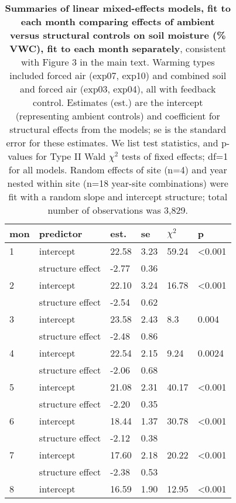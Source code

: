 \documentclass{article}
\begin{document}
\begin{table}[ht]
\centering
\caption{\textbf{Summaries of linear mixed-effects models, fit to each month comparing effects of ambient versus structural controls on soil moisture (\% VWC), fit to each month separately}, consistent with Figure 3 in the main text. Warming types included forced air (exp07, exp10) and combined soil and forced air (exp03, exp04), all with feedback control. Estimates (est.) are the intercept (representing ambient controls) and coefficient for structural effects from the models; se is the standard error for these estimates. We list test statistics, and p-values for Type II Wald $\chi^{2}$ tests of fixed effects; df=1 for all models. Random effects of site (n=4) and year nested within site (n=18 year-site combinations) were fit with a random slope and intercept structure; total number of observations was 3,829.} 
\label{table:shamamb_soilmoism}
\begingroup\footnotesize
\begin{tabular}{|p{}|p{}p{}p{}p{}p{}|}
  \hline
mon & predictor & est. & se & $\chi^2$ & p \\ 
  \hline
  1 & intercept & 22.58 & 3.23 & 59.24 & <0.001 \\ 
   & structure effect & -2.77 & 0.36 &  &  \\ 
   \hline
  2 & intercept & 22.10 & 3.24 & 16.78 & <0.001 \\ 
   & structure effect & -2.54 & 0.62 &  &  \\ 
   \hline
  3 & intercept & 23.58 & 2.43 & 8.3 & 0.004 \\ 
   & structure effect & -2.48 & 0.86 &  &  \\ 
   \hline
  4 & intercept & 22.54 & 2.15 & 9.24 & 0.0024 \\ 
   & structure effect & -2.06 & 0.68 &  &  \\ 
   \hline
  5 & intercept & 21.08 & 2.31 & 40.17 & <0.001 \\ 
   & structure effect & -2.20 & 0.35 &  &  \\ 
   \hline
  6 & intercept & 18.44 & 1.37 & 30.78 & <0.001 \\ 
   & structure effect & -2.12 & 0.38 &  &  \\ 
   \hline
  7 & intercept & 17.60 & 2.18 & 20.22 & <0.001 \\ 
   & structure effect & -2.38 & 0.53 &  &  \\ 
   \hline
  8 & intercept & 16.59 & 1.90 & 12.95 & <0.001 \\ 

\end{tabular}
\end{table}
\end{document}
